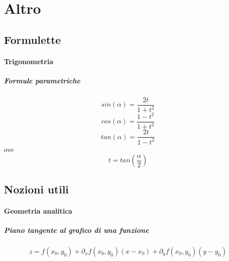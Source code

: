 \documentclass[a4paper,10pt]{book}
\begin{document}
\section{Altro}
\subsection{Formulette}
\paragraph{Trigonometria}
\subparagraph{Formule parametriche}
$$sin(\alpha) = \frac{2t}{1+t^2}$$
$$cos(\alpha) = \frac{1-t^2}{1+t^2}$$
$$tan(\alpha) = \frac{2t}{1-t^2}$$
ove $$t = tan\left(\frac{\alpha}{2}\right)$$
\subsection{Nozioni utili}
\paragraph{Geometria analitica}
\subparagraph{Piano tangente al grafico di una funzione}
$$z = f(x_0, y_0) + \partial_x f(x_0, y_0) (x-x_0) + \partial_y f(x_0, y_0) (y - y_0) $$
\end{document}
